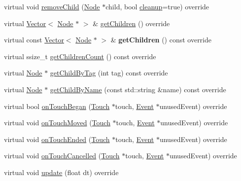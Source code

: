 \begin{DoxyCompactItemize}
\item 
virtual void \hyperlink{classui_1_1ScrollView_a678108e716966e8beccc25c0de1d9b29}{remove\+Child} (\hyperlink{classNode}{Node} $\ast$child, bool \hyperlink{classProtectedNode_a5462a6202b458193c1881bcdcc5be78d}{cleanup}=true) override
\item 
virtual \hyperlink{classVector}{Vector}$<$ \hyperlink{classNode}{Node} $\ast$ $>$ \& \hyperlink{classui_1_1ScrollView_abde6bf60f60db8d75ac5a63aa0f47dbc}{get\+Children} () override
\item 
\mbox{\label{classui_1_1ScrollView_a66805c9c68663fa9ad719f766f98f7f9}} 
virtual const \hyperlink{classVector}{Vector}$<$ \hyperlink{classNode}{Node} $\ast$ $>$ \& {\bfseries get\+Children} () const override
\item 
virtual ssize\+\_\+t \hyperlink{classui_1_1ScrollView_ab3597728897d06856656a377ef26e73c}{get\+Children\+Count} () const override
\item 
virtual \hyperlink{classNode}{Node} $\ast$ \hyperlink{classui_1_1ScrollView_a0c523b2f58f7916aa9aaf7bcab4781a7}{get\+Child\+By\+Tag} (int tag) const override
\item 
virtual \hyperlink{classNode}{Node} $\ast$ \hyperlink{classui_1_1ScrollView_a9750342974b85647eac63dc49db4292f}{get\+Child\+By\+Name} (const std\+::string \&name) const override
\item 
virtual bool \hyperlink{classui_1_1ScrollView_a8cef5058b831f9b3644d894408371245}{on\+Touch\+Began} (\hyperlink{classTouch}{Touch} $\ast$touch, \hyperlink{classEvent}{Event} $\ast$unused\+Event) override
\item 
virtual void \hyperlink{classui_1_1ScrollView_aabab84777e16b8c5d90cd8d045e45471}{on\+Touch\+Moved} (\hyperlink{classTouch}{Touch} $\ast$touch, \hyperlink{classEvent}{Event} $\ast$unused\+Event) override
\item 
virtual void \hyperlink{classui_1_1ScrollView_a74f857678194c7be230c7f66306ad5c6}{on\+Touch\+Ended} (\hyperlink{classTouch}{Touch} $\ast$touch, \hyperlink{classEvent}{Event} $\ast$unused\+Event) override
\item 
virtual void \hyperlink{classui_1_1ScrollView_ab1dd25cb7c32f13d8920b796986f1fea}{on\+Touch\+Cancelled} (\hyperlink{classTouch}{Touch} $\ast$touch, \hyperlink{classEvent}{Event} $\ast$unused\+Event) override
\item 
virtual void \hyperlink{classui_1_1ScrollView_a15b50cbbccdeff8dd34e8d0ab6ea82f7}{update} (float dt) override
\item 

\end{DoxyCompactItemize}
